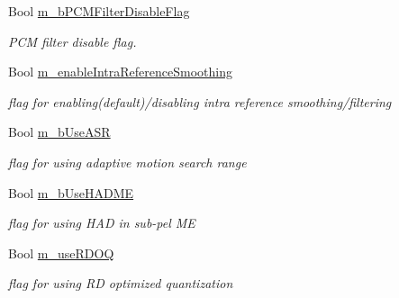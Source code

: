 \begin{DoxyCompactItemize}
\mbox{\label{class_t_app_enc_cfg_a080a218aa1b5cb15e511b4943161e6ec}} 
Bool \hyperlink{class_t_app_enc_cfg_a080a218aa1b5cb15e511b4943161e6ec}{m\+\_\+b\+P\+C\+M\+Filter\+Disable\+Flag}
\begin{DoxyCompactList}\small\item\em P\+CM filter disable flag. \end{DoxyCompactList}\item 
\mbox{\label{class_t_app_enc_cfg_a312bc4140cac28052edc1fad21ff6b92}} 
Bool \hyperlink{class_t_app_enc_cfg_a312bc4140cac28052edc1fad21ff6b92}{m\+\_\+enable\+Intra\+Reference\+Smoothing}
\begin{DoxyCompactList}\small\item\em flag for enabling(default)/disabling intra reference smoothing/filtering \end{DoxyCompactList}\item 
\mbox{\label{class_t_app_enc_cfg_a18a8f5205602eed210dcd61d5c6c689a}} 
Bool \hyperlink{class_t_app_enc_cfg_a18a8f5205602eed210dcd61d5c6c689a}{m\+\_\+b\+Use\+A\+SR}
\begin{DoxyCompactList}\small\item\em flag for using adaptive motion search range \end{DoxyCompactList}\item 
\mbox{\label{class_t_app_enc_cfg_a1028ece26c65fe3513c731fdf408a46b}} 
Bool \hyperlink{class_t_app_enc_cfg_a1028ece26c65fe3513c731fdf408a46b}{m\+\_\+b\+Use\+H\+A\+D\+ME}
\begin{DoxyCompactList}\small\item\em flag for using H\+AD in sub-\/pel ME \end{DoxyCompactList}\item 
\mbox{\label{class_t_app_enc_cfg_a5b9f26b1e36ad933e2a8e304d46f9849}} 
Bool \hyperlink{class_t_app_enc_cfg_a5b9f26b1e36ad933e2a8e304d46f9849}{m\+\_\+use\+R\+D\+OQ}
\begin{DoxyCompactList}\small\item\em flag for using RD optimized quantization \end{DoxyCompactList}\item 
\mbox{\label{class_t_app_enc_cfg_a3884a14af93034aaebb7db14a9477445}} 

\end{DoxyCompactItemize}
